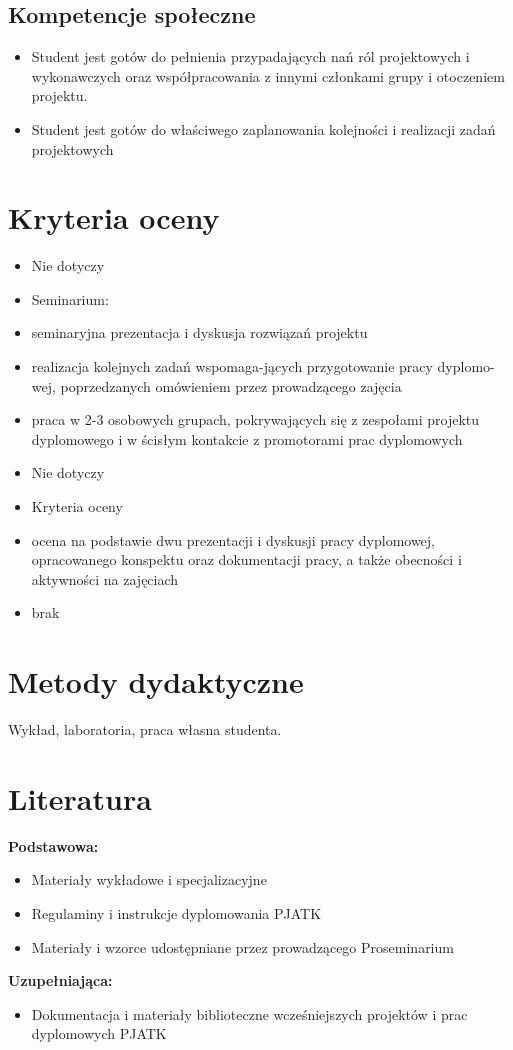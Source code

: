 \documentclass[12pt, a4paper]{article}
\begin{document}
\subsection*{Kompetencje społeczne}
\begin{itemize}
  \item Student jest gotów do  pełnienia przypadających nań ról projektowych i  wykonawczych oraz współpracowania z innymi członkami grupy i otoczeniem projektu.
  \item Student jest gotów do  właściwego zaplanowania kolejności i realizacji zadań projektowych
\end{itemize}

\section{Kryteria oceny}

\begin{itemize}
  \item Nie dotyczy
  \item Seminarium:
  \item seminaryjna prezentacja i dyskusja rozwiązań projektu
  \item realizacja kolejnych zadań wspomaga-jących przygotowanie pracy dyplomo-wej, poprzedzanych omówieniem przez prowadzącego zajęcia
  \item praca w 2-3 osobowych grupach, pokrywających się z zespołami projektu dyplomowego i w ścisłym kontakcie z promotorami prac dyplomowych
  \item Nie dotyczy
  \item Kryteria oceny
  \item ocena na podstawie dwu prezentacji i dyskusji pracy dyplomowej, opracowanego konspektu oraz dokumentacji pracy, a także obecności i aktywności na zajęciach
  \item brak
\end{itemize}

\section{Metody dydaktyczne}

Wykład, laboratoria, praca własna studenta.

\section{Literatura}

\textbf{Podstawowa:}
\begin{itemize}
  \item Materiały wykładowe i specjalizacyjne
  \item Regulaminy i instrukcje dyplomowania PJATK
  \item Materiały i wzorce udostępniane przez prowadzącego Proseminarium
\end{itemize}

\textbf{Uzupełniająca:}
\begin{itemize}
  \item Dokumentacja i materiały biblioteczne wcześniejszych projektów i prac dyplomowych PJATK
\end{itemize}
\end{document}
